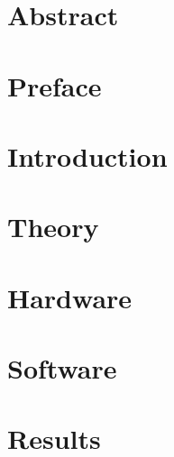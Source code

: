 \documentclass[a4paper]{report}
\begin{document}
\begin{titlepage}

\end{titlepage}

\clearpage
\chapter*{Abstract}



\clearpage
\chapter*{Preface}


\clearpage
\setlength{\columnseprule}{0.2pt}
\tableofcontents %
\vspace{0.5em}

\clearpage

\printglossary[type=\acronymtype]
\noindent
\printglossary[type=main]

\clearpage
\setcounter{page}{2}
\chapter{Introduction}


\clearpage
\chapter{Theory}\label{sec:Theory}


\clearpage
\chapter{Hardware}\label{sec:pcb}


\clearpage
\chapter{Software}\label{sec:software}


\clearpage
\chapter{Results}\label{sec:results}

\end{document}
